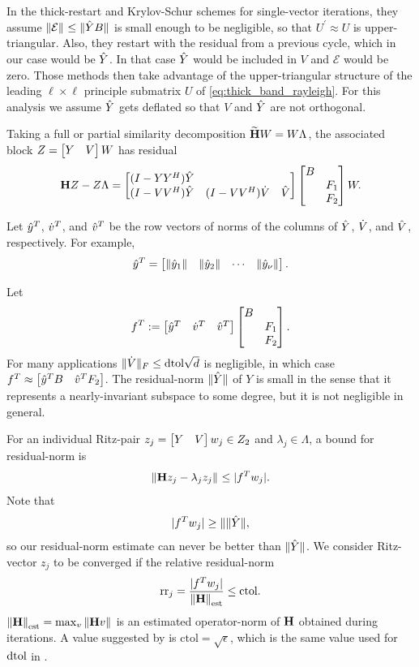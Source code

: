  In the thick-restart \cite{dynamicthick} and Krylov-Schur  \cite{stewart2002krylov} schemes for single-vector iterations, they assume $\left\| \mathcal{E} \right\|_{}\leq\|\hat{Y} B \|$ is small enough to be negligible, so that $U^\prime\approx U$ is upper-triangular.  Also, they restart with the residual from a previous cycle, which in our case would be $\hat{Y}$.  In that case $\hat{Y}$ would be included in $V$ and $\mathcal{E}$ would be zero.  Those methods then take advantage of the upper-triangular structure of the leading $\ell\times\ell$ principle submatrix $U$ of \eqref{eq:thick_band_rayleigh}. For this analysis we assume $\hat{Y}$ gets deflated so that $V$ and $\hat{Y}$ are not orthogonal.  

Taking a full or partial similarity decomposition $\widetilde{\textbf{\textup{H}}} W = W \Lambda$, the associated block $Z= \begin{bmatrix} Y&V\end{bmatrix}W$ has residual
\[
\textbf{\textup{H}} Z - Z \Lambda = \begin{bmatrix} (I-YY^H)\hat{Y} & & \\
		(I-VV^H)\hat{Y} &(I-VV^H)\dot{V} & \hat{V} \end{bmatrix} \begin{bmatrix} B&\\&F_1\\&F_2\end{bmatrix} W.
\]

Let $\hat{y}^T$, $\dot{v}^T$,  and $\hat{v}^T$ be the row vectors of norms of the columns of $\hat{Y}$, $\dot{V}$, and $\hat{V}$, respectively.  For example, 
\[
\hat{y}^T = \begin{bmatrix} \| \hat{y}_1 \| &\| \hat{y}_2 \| &\cdots&\| \hat{y}_\nu \|\end{bmatrix} . 
\]

Let
\[
 f^T:=\begin{bmatrix} \hat{y}^T  & \dot{v}^T   & \hat{v}^T \end{bmatrix}\begin{bmatrix} B&\\&F_1\\&F_2\end{bmatrix}.
\]
For many  applications $\| \dot{V} \|_F\leq \text{dtol} \sqrt{d}$ is negligible, in which case $f^T \approx \begin{bmatrix} \hat{y}^T B & \hat{v}^T F_2\end{bmatrix}$.  The residual-norm $\| \hat{Y} \|$ of $Y$ is small in the sense that it represents a nearly-invariant subspace to some degree, but it is not negligible in general. 

 
  For an individual Ritz-pair $z_j=\begin{bmatrix} Y&V\end{bmatrix}w_j\in Z_2$ and $\lambda_j\in\Lambda$, a bound for residual-norm is
\begin{equation}
\left\| \textbf{\textup{H}} z_j - \lambda_j z_j \right\|_{} \leq |f^T w_j|.
\label{eq:ritz_resid_bound1}
\end{equation}
Note that 
\[
|f^T w_j| \geq \| \| \hat{Y} \|,
\]
so our residual-norm estimate can never be better than $\| \hat{Y}\|$.
We consider Ritz-vector $z_j$ to be converged if the relative residual-norm
\begin{equation}
\text{rr}_j = \frac{|f^T w_j|}{\left\| \textbf{\textup{H}} \right\|_{\text{est}}} \leq \text{ctol}.
\label{eq:rr_band1}
\end{equation}
 $\left\| \textbf{\textup{H}} \right\|_{\text{est}}=\max_{v}\left\| \textbf{\textup{H}} v \right\|_{}$ is an estimated operator-norm of $\textbf{\textup{H}}$ obtained during iterations.   A value suggested by \cite{parlett1979lanczos}  is $\text{ctol}=\sqrt{\epsilon}$, which is the same value used for $\text{dtol}$ in \cite{AN}.   

